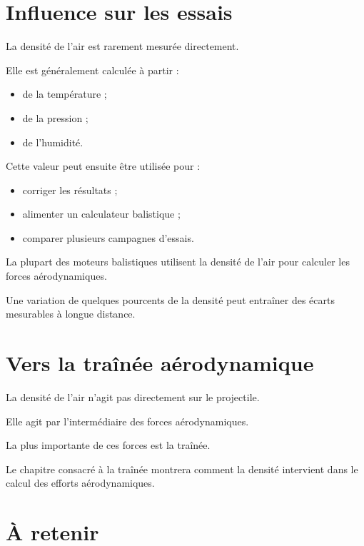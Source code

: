 \section{Influence sur les essais}

La densité de l'air est rarement mesurée directement.

Elle est généralement calculée à partir :

\begin{itemize}
\item de la température ;
\item de la pression ;
\item de l'humidité.
\end{itemize}

Cette valeur peut ensuite être utilisée pour :

\begin{itemize}
\item corriger les résultats ;
\item alimenter un calculateur balistique ;
\item comparer plusieurs campagnes d'essais.
\end{itemize}

\begin{simulation}

La plupart des moteurs balistiques utilisent la densité de l'air pour
calculer les forces aérodynamiques.

Une variation de quelques pourcents de la densité peut entraîner des
écarts mesurables à longue distance.

\end{simulation}

\section{Vers la traînée aérodynamique}

La densité de l'air n'agit pas directement sur le projectile.

Elle agit par l'intermédiaire des forces aérodynamiques.

La plus importante de ces forces est la traînée.

Le chapitre consacré à la traînée montrera comment la densité intervient
dans le calcul des efforts aérodynamiques.

\section{À retenir}

